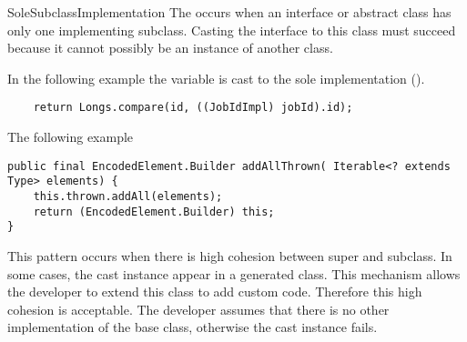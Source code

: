 \begin{pattern}{SoleSubclassImplementation}
The \thisp{} occurs when an interface or abstract class has only one implementing subclass.
Casting the interface to this class must succeed because it cannot possibly be an instance of another class.

\instances{}
In the following example%
\def\urlvar{http://bit.ly/ow2_proactive_scheduling_2Ulcjfs}
the  variable is cast to the sole implementation ().

\begin{verbatim}
    return Longs.compare(id, ((JobIdImpl) jobId).id);
\end{verbatim}

The following example%
\def\urlvar{http://bit.ly/immutables_immutables_2S4BoJs}

\begin{verbatim}
public final EncodedElement.Builder addAllThrown( Iterable<? extends Type> elements) {
    this.thrown.addAll(elements);
    return (EncodedElement.Builder) this;
}
\end{verbatim}


\discussion{}
This pattern occurs when there is high cohesion between super and subclass.
In some cases, the cast instance appear in a generated class.
This mechanism allows the developer to extend this class to add custom code.
Therefore this high cohesion is acceptable.
The developer assumes that there is no other implementation of the base class,
otherwise the cast instance fails.

\end{pattern}
